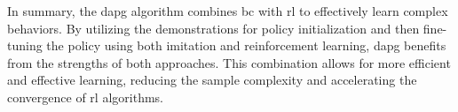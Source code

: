 In summary, the \gls{dapg} algorithm combines \gls{bc} with \gls{rl} to effectively learn complex behaviors. By utilizing the demonstrations for policy initialization and then fine-tuning the policy using both imitation and reinforcement learning, \gls{dapg} benefits from the strengths of both approaches. This combination allows for more efficient and effective learning, reducing the sample complexity and accelerating the convergence of \gls{rl} algorithms.









